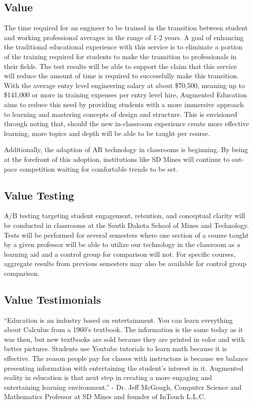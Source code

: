\subsection{Value} 
The time required for an engineer to be trained in the transition between student and working professional averages in the range of 1-2 years. A goal of enhancing the traditional educational experience with this service is to eliminate a portion of the training required for students to make the transition to professionals in their fields. The test results will be able to support the claim that this service will reduce the amount of time is required to successfully make this transition.  With the average entry level engineering salary at about \$70,500, meaning up to \$141,000 or more in training expenses per entry level hire, Augmented Education aims to reduce this need by providing students with a more immersive approach to learning and mastering concepts of design and structure. This is envisioned through noting that, should the new in-classroom experience create more effective learning, more topics and depth will be able to be taught per course.

Additionally, the adaption of AR technology in classrooms is beginning. By being at the forefront of this adoption, institutions like SD Mines will continue to out-pace competition waiting for comfortable trends to be set. 


\subsection{Value Testing} 
A/B testing targeting student engagement, retention, and conceptual clarity will be conducted in classrooms at the South Dakota School of Mines and Technology. Tests will be performed for several semesters where one section of a course taught by a given professor will be able to utilize our technology in the classroom as a learning aid and a control group for comparison will not. For specific courses, aggregate results from previous semesters may also be available for control group comparison. 

\subsection{Value Testimonials}
“Education is an industry based on entertainment. You can learn everything about Calculus from a 1960’s textbook. The information is the same today as it was then, but new textbooks are sold because they are printed in color and with better pictures. Students use Youtube tutorials to learn math because it is effective. The reason people pay for classes with instructors is because we balance presenting information with entertaining the student’s interest in it. Augmented reality in education is that next step in creating a more engaging and entertaining learning environment.” - Dr. Jeff McGough, Computer Science and Mathematics Professor at SD Mines and founder of InTouch L.L.C.

